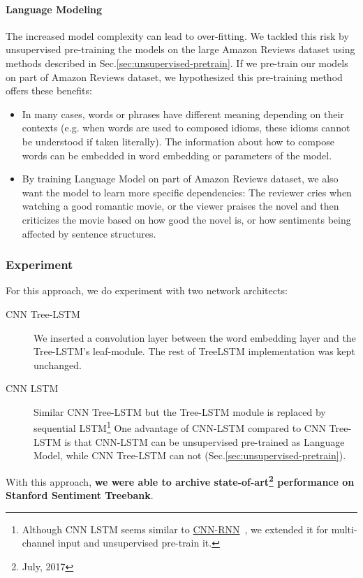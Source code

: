 \paragraph{Language Modeling}
The increased model complexity can lead to over-fitting.
We tackled this risk by unsupervised pre-training the models on the large Amazon Reviews dataset using methods described in Sec.\ref{sec:unsupervised-pretrain}.
If we pre-train our models on part of Amazon Reviews dataset, we hypothesized this pre-training method offers these benefits:
\begin{itemize}
\item In many cases, words or phrases have different meaning depending on their contexts (e.g. when words are used to composed idioms, these idioms cannot be understood if taken literally).
The information about how to compose words can be embedded in word embedding or parameters of the model.
\item By training Language Model on part of Amazon Reviews dataset, we also want the model to learn more specific dependencies: The reviewer cries when watching a good romantic movie, or the viewer praises the novel and then criticizes the movie based on how good the novel is, or how sentiments being affected by sentence structures. 
\end{itemize} 

\subsubsection{Experiment}
For this approach, we do experiment with two network architects:
\begin{description}
\item[CNN Tree-LSTM] We inserted a convolution layer between the word embedding layer and the Tree-LSTM's leaf-module.
The rest of TreeLSTM implementation was kept unchanged.

\item[CNN LSTM] Similar CNN Tree-LSTM but the Tree-LSTM module is replaced by sequential LSTM\footnote{Although CNN LSTM seems similar to \hyperref[cnn-rnn]{CNN-RNN}~\cite{cnn-rnn}, we extended it for multi-channel input and unsupervised pre-train it.}
One advantage of CNN-LSTM compared to CNN Tree-LSTM is that CNN-LSTM can be unsupervised pre-trained as Language Model, while CNN Tree-LSTM can not (Sec.\ref{sec:unsupervised-pretrain}).
\end{description}

With this approach, \textbf{we were able to archive state-of-art\footnote{July, 2017} performance on Stanford Sentiment Treebank}.


